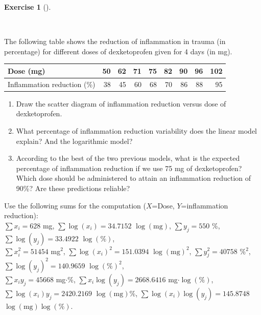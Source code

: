 \documentclass[
  a4paper,
]{scrreport}
\theoremstyle{definition}
\newtheorem{exercise}{Exercise}[chapter]
\theoremstyle{remark}
\begin{document}
\begin{exercise}[]\protect\hypertarget{exr-2}{}\label{exr-2}

~

The following table shows the reduction of inflammation in trauma (in
percentage) for different doses of dexketoprofen given for 4 days (in
mg).

\begin{table}
\centering
\begin{tabular}[t]{l|r|r|r|r|r|r|r|r}
\hline
Dose (mg) & 50 & 62 & 71 & 75 & 82 & 90 & 96 & 102\\
\hline
Inflammation reduction (\%) & 38 & 45 & 60 & 68 & 70 & 86 & 88 & 95\\
\hline
\end{tabular}
\end{table}

\begin{enumerate}
\def\labelenumi{\alph{enumi}.}
\item
  Draw the scatter diagram of inflammation reduction versus dose of
  dexketoprofen.
\item
  What percentage of inflammation reduction variability does the linear
  model explain? And the logarithmic model?
\item
  According to the best of the two previous models, what is the expected
  percentage of inflammation reduction if we use 75 mg of dexketoprofen?
  Which dose should be administered to attain an inflammation reduction
  of 90\%? Are these predictions reliable?
\end{enumerate}

Use the following sums for the computation (\(X\)=Dose,
\(Y\)=inflammation reduction):\\
\(\sum x_i=628\) mg, \(\sum \log(x_i)=34.7152\) \(\log(\mbox{mg})\),
\(\sum y_j=550\) \%, \(\sum \log(y_j)=33.4922\) \(\log(\mbox{\%})\),\\
\(\sum x_i^2=51454\) mg\(^2\), \(\sum \log(x_i)^2=151.0394\)
\(\log(\mbox{mg})^2\), \(\sum y_j^2=40758\) \%\(^2\),
\(\sum \log(y_j)^2=140.9659\) \(\log(\mbox{\%})^2\),\\
\(\sum x_iy_j=45668\) mg\(\cdot\)\%, \(\sum x_i\log(y_j)=2668.6416\)
mg\(\cdot\log(\mbox{\%})\), \(\sum \log(x_i)y_j=2420.2169\)
\(\log(\mbox{mg})\)\%, \(\sum \log(x_i)\log(y_j)=145.8748\)
\(\log(\mbox{mg})\log(\mbox{\%})\).

\begin{tcolorbox}[enhanced jigsaw, colback=white, title=\textcolor{quarto-callout-tip-color}{\faLightbulb}\hspace{0.5em}{Solution}, arc=.35mm, colbacktitle=quarto-callout-tip-color!10!white, breakable, leftrule=.75mm, colframe=quarto-callout-tip-color-frame, opacitybacktitle=0.6, left=2mm, toptitle=1mm, bottomtitle=1mm, titlerule=0mm, rightrule=.15mm, bottomrule=.15mm, toprule=.15mm, opacityback=0, coltitle=black]


\end{tcolorbox}
\end{exercise}
\end{document}
